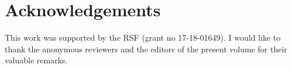 \documentclass[output=paper,colorlinks,citecolor=brown]{langscibook}
\begin{document}


\section*{Acknowledgements}

This work was supported by the RSF (grant no 17-18-01649). I would like to thank the anonymous reviewers and the editors of the present volume for their valuable remarks.

{\sloppy\printbibliography[heading=subbibliography,notkeyword=this]}
\end{document}
